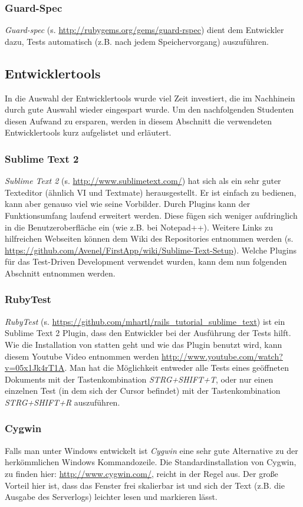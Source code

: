 \documentclass[12pt,             %
               a4paper,          %
               listof=totoc,     %
               index=totoc,      %
               bibliography=totoc,%
               oneside,         %
               BCOR1cm,          %
               english   %
               ]{scrbook}
\begin{document}
\subsubsection{Guard-Spec}
\textit{Guard-spec} (s. \url{http://rubygems.org/gems/guard-rspec}) dient dem Entwickler dazu, Tests automatisch (z.B. nach jedem Speichervorgang) auszuführen. 

\subsection{Entwicklertools}
In die Auswahl der Entwicklertools wurde viel Zeit investiert, die im Nachhinein durch gute Auswahl wieder eingespart wurde. Um den nachfolgenden Studenten diesen Aufwand zu ersparen, werden in diesem Abschnitt die verwendeten Entwicklertools kurz aufgelistet und erläutert. 

\subsubsection{Sublime Text 2}
\textit{Sublime Text 2} (s. \url{http://www.sublimetext.com/}) hat sich als ein sehr guter Texteditor (ähnlich VI und Textmate) herausgestellt. Er ist einfach zu bedienen, kann aber genauso viel wie seine Vorbilder. Durch Plugins kann der Funktionsumfang laufend erweitert werden. Diese fügen sich weniger aufdringlich in die Benutzeroberfläche ein (wie z.B. bei Notepad++). Weitere Links zu hilfreichen Webseiten können dem Wiki des Repositories entnommen werden (s. \url{https://github.com/Avenel/FirstApp/wiki/Sublime-Text-Setup}).
Welche Plugins für das Test-Driven Development verwendet wurden, kann dem nun folgenden Abschnitt entnommen werden. 

\subsubsection{RubyTest}
\textit{RubyTest} (s. \url{https://github.com/mhartl/rails_tutorial_sublime_text}) ist ein Sublime Text 2 Plugin, dass den Entwickler bei der Ausführung der Tests hilft. Wie die Installation von statten geht und wie das Plugin benutzt wird, kann diesem Youtube Video entnommen werden \url{http://www.youtube.com/watch?v=05x1Jk4rT1A}. Man hat die Möglichkeit entweder alle Tests eines geöffneten Dokuments mit der Tastenkombination \textit{STRG+SHIFT+T}, oder nur einen einzelnen Test (in dem sich der Cursor befindet) mit der Tastenkombination \textit{STRG+SHIFT+R} auszuführen.


\subsubsection{Cygwin}
Falls man unter Windows entwickelt ist \textit{Cygwin} eine sehr gute Alternative zu der herkömmlichen Windows Kommandozeile. Die Standardinstallation von Cygwin, zu finden hier: \url{http://www.cygwin.com/}, reicht in der Regel aus. Der große Vorteil hier ist, dass das Fenster frei skalierbar ist und sich der Text (z.B. die Ausgabe des Serverlogs) leichter lesen und markieren lässt. 
\end{document}

